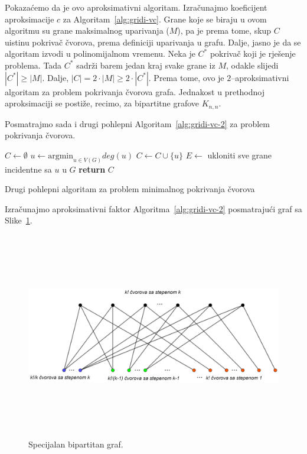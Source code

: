 \documentclass[b5paper, utf8, 11pt, colorlinks]{book}
\theoremstyle{definition}
\begin{document}
  \noindent Pokazaćemo da je ovo aproksimativni algoritam. Izračunajmo koeficijent aproksimacije $c$ za Algoritam~\ref{alg:gridi-vc}.
  Grane koje se biraju u ovom algoritmu su grane maksimalnog uparivanja ($M$), pa je prema tome, skup $C$ uistinu pokrivač čvorova, prema definiciji uparivanja u grafu. Dalje, jasno je da se algoritam izvodi u polinomijalnom vremenu. Neka je $C^*$ pokrivač koji je rješenje problema. Tada $C^*$ sadrži barem jedan kraj svake grane iz $M$, odakle slijedi $|C^*|\geq |M|$. Dalje, $|C|= 2 \cdot |M| \geq 2 \cdot |C^*|$. Prema tome, ovo je $2$--aproksimativni algoritam za problem pokrivanja čvorova grafa. Jednakost u prethodnoj aproksimaciji se postiže, recimo, za bipartitne grafove $K_{n,n}$. 
 
  
  Posmatrajmo sada i drugi pohlepni Algoritam~\ref{alg:gridi-vc-2} za problem pokrivanja čvorova.  
  
  \begin{algorithm}[H] 
  	\begin{algorithmic}[1]
  		\STATE $C \gets \emptyset$
  		\STATE  $u \gets \textrm{argmin}_{u \in V(G)} deg(u)$
  		\STATE  $C \gets C \cup \{u\}$
  		\STATE $E \gets$ ukloniti sve grane incidentne sa $u$ u $G$  
  		\ENDWHILE
  		\STATE \textbf{return} $C$
  	\end{algorithmic}
     	\caption{Drugi pohlepni algoritam za problem minimalnog pokrivanja čvorova}
        \label{alg:gridi-vc-2}
  \end{algorithm}
  
  \noindent Izračunajmo aproksimativni faktor Algoritma~\ref{alg:gridi-vc-2} posmatrajući  graf sa Slike~\ref{vertex-coverEx}. 
  
  
  \begin{figure}[h]
  	\centering
  	\includegraphics[width=140mm,height=90mm]{vc-2-example.eps}
  	\caption{Specijalan bipartitan graf.} 
  	\label{vertex-coverEx}
  \end{figure}
  
\end{document}
